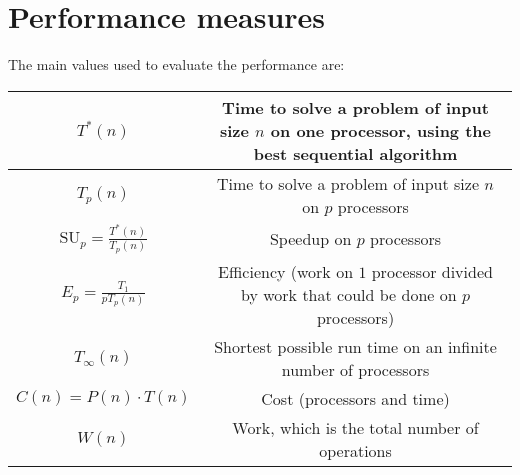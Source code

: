 \section{Performance measures}

The main values used to evaluate the performance are: 

\renewcommand*{\arraystretch}{2}
\begin{table}[H]
    \centering
    \begin{tabular}{|c|c|}
    \hline
    $T^\ast(n)$ & \makecell{Time to solve a problem of input size $n$ on one processor, \\ using the best sequential algorithm}                 \\ \hline
    $T_p(n)$ & Time to solve a problem of input size $n$ on $p$ processors                \\ \hline
    $\text{SU}_p = \frac{T^\ast(n)}{T_p(n)}$ & Speedup on $p$ processors           \\ \hline
    $E_p = \frac{T_1}{p T_p(n)}$ & \makecell{Efficiency (work on $1$ processor divided by work that could be\\ done on $p$ processors)} \\ \hline
    $T_{\infty}(n)$ & Shortest possible run time on an infinite number of processors             \\ \hline
    $C(n) = P(n) \cdot T(n)$ & Cost (processors and time)        \\ \hline
    $W(n)$ & Work, which is the total number of operations           \\ \hline
    \end{tabular}
\end{table}
\renewcommand*{\arraystretch}{1}
